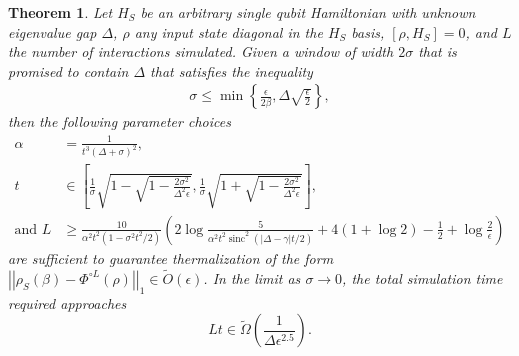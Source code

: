 \documentclass{article}
\newtheorem{theorem}{Theorem}
\newcommand{\norm}[1]{\left| \left| #1 \right| \right|}
\newcommand{\set}[1]{\left\{ #1 \right\}}
\newcommand{\bigotilde}[1]{\widetilde{O} \left( #1 \right)}
\DeclareMathOperator{\sinc}{sinc}
\begin{document}
\begin{theorem} \label{thm:single_qubit}
    Let $H_S$ be an arbitrary single qubit Hamiltonian with unknown eigenvalue gap $\Delta$, $\rho$ any input state diagonal in the $H_S$ basis, $[\rho, H_S] = 0$, and $L$ the number of interactions simulated. Given a window of width $2 \sigma$ that is promised to contain $\Delta$ that satisfies the inequality
    \begin{align}
        \sigma \le \min \set{\frac{\epsilon}{2\beta}, \Delta \sqrt{\frac{\epsilon}{2}}},
    \end{align}
    then the following parameter choices 
    \begin{align}
        \alpha &= \frac{1}{t^3(\Delta + \sigma)^2}, \nonumber \\
        t &\in \left[ \frac{1}{\sigma}\sqrt{1 - \sqrt{1 - \frac{2 \sigma^2}{\Delta^2 \epsilon}} }, \frac{1}{\sigma}\sqrt{1 + \sqrt{1 - \frac{2 \sigma^2}{\Delta^2 \epsilon}} } \right], \nonumber \\
        \text{and } L &\ge \frac{10}{\alpha^2 t^2 (1 - \sigma^2 t^2 / 2)} \left( 2 \log \frac{5}{\alpha^2 t^2 \sinc^2(|\Delta - \gamma|t/2)} + 4( 1 + \log 2) - \frac{1}{2} + \log \frac{2}{\epsilon} \right)
    \end{align}
    are sufficient to guarantee thermalization of the form $\norm{\rho_S(\beta) - \Phi^{\circ L}(\rho)}_1 \in \bigotilde{\epsilon}$. In the limit as $\sigma \to 0$, the total simulation time required approaches
    \begin{equation}
        Lt \in \widetilde{\Omega} \left( \frac{1}{\Delta \epsilon^{2.5}}\right).
    \end{equation}
\end{theorem}
\end{document}
